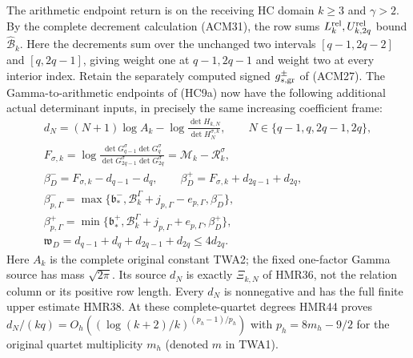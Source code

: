 The arithmetic endpoint return is on the receiving HC domain
$k\geq3$ and $\gamma>2$. By the complete decrement calculation
(ACM31), the row sums $L_k^{\rm rel},U_{k,2q}^{\rm rel}$
bound $\widehat{\mathcal B}_k$. Here the decrements sum over
the unchanged two intervals $[q-1,2q-2]$ and $[q,2q-1]$,
giving weight one at $q-1,2q-1$ and weight two at every
interior index. Retain the separately computed signed
$g_{s,\rm gr}^{\pm}$ of (ACM27). The Gamma-to-arithmetic
endpoints of (HC9a) now have the following additional
actual determinant inputs, in precisely the same increasing
coefficient frame:
\[
\begin{gathered}
 d_N=(N+1)\log A_k-
       \log\frac{\det H_{k,N}}{\det H_N^{\sigma,k}},\qquad
 N\in\{q-1,q,2q-1,2q\},\\
 F_{\sigma,k}
 =\log\frac{\det G_{q-1}^{\sigma}\det G_q^{\sigma}}
                {\det G_{2q-1}^{\sigma}\det G_{2q}^{\sigma}}
 =\mathcal M_k-\mathcal R_k^\sigma,\\
 \beta_D^-=F_{\sigma,k}-d_{q-1}-d_q,\qquad
 \beta_D^+=F_{\sigma,k}+d_{2q-1}+d_{2q},\\
 \beta_{p,\Gamma}^-=\max\{
 \mathfrak b_*^-,
 \mathcal B_k^\Gamma+j_{p,\Gamma}-e_{p,\Gamma},\beta_D^-\},\\
 \beta_{p,\Gamma}^+=\min\{
 \mathfrak b_*^+,
 \mathcal B_k^\Gamma+j_{p,\Gamma}+e_{p,\Gamma},\beta_D^+\},\\
 \mathfrak w_D=d_{q-1}+d_q+d_{2q-1}+d_{2q}
                  \leq4d_{2q}.
\end{gathered}\tag{R66d1}
\]
Here $A_k$ is the complete original constant TWA2; the
fixed one-factor Gamma source has mass $\sqrt{2\pi}$.
Its source $d_N$ is exactly $\Xi_{k,N}$ of HMR36, not
the relation column or its positive row length.
Every $d_N$ is nonnegative and has the full finite
upper estimate HMR38. At these complete-quartet degrees
HMR44 proves
$d_N/(kq)=O_h((\log(k+2)/k)^{(p_h-1)/p_h})$ with
$p_h=8m_h-9/2$ for the original quartet multiplicity $m_h$
(denoted $m$ in TWA1).


